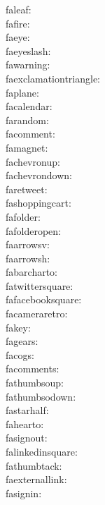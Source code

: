 faleaf: {\FA \faleaf} \\
fafire: {\FA \fafire} \\
faeye: {\FA \faeye} \\
faeyeslash: {\FA \faeyeslash} \\
fawarning: {\FA \fawarning} \\
faexclamationtriangle: {\FA \faexclamationtriangle} \\
faplane: {\FA \faplane} \\
facalendar: {\FA \facalendar} \\
farandom: {\FA \farandom} \\
facomment: {\FA \facomment} \\
famagnet: {\FA \famagnet} \\
fachevronup: {\FA \fachevronup} \\
fachevrondown: {\FA \fachevrondown} \\
faretweet: {\FA \faretweet} \\
fashoppingcart: {\FA \fashoppingcart} \\
fafolder: {\FA \fafolder} \\
fafolderopen: {\FA \fafolderopen} \\
faarrowsv: {\FA \faarrowsv} \\
faarrowsh: {\FA \faarrowsh} \\
fabarcharto: {\FA \fabarcharto} \\
fatwittersquare: {\FA \fatwittersquare} \\
fafacebooksquare: {\FA \fafacebooksquare} \\
facameraretro: {\FA \facameraretro} \\
fakey: {\FA \fakey} \\
fagears: {\FA \fagears} \\
facogs: {\FA \facogs} \\
facomments: {\FA \facomments} \\
fathumbsoup: {\FA \fathumbsoup} \\
fathumbsodown: {\FA \fathumbsodown} \\
fastarhalf: {\FA \fastarhalf} \\
fahearto: {\FA \fahearto} \\
fasignout: {\FA \fasignout} \\
falinkedinsquare: {\FA \falinkedinsquare} \\
fathumbtack: {\FA \fathumbtack} \\
faexternallink: {\FA \faexternallink} \\
fasignin: {\FA \fasignin} \\
